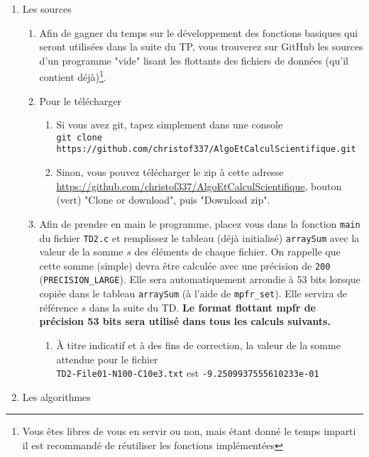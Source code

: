 \documentclass{exam}
\begin{document}
    \begin{enumerate}
        \item Les sources
        \begin{enumerate}
            \item Afin de gagner du temps sur le développement des fonctions basiques qui seront utilisées dans la suite du TP, vous trouverez sur GitHub les sources d'un programme "vide" lisant les flottants des fichiers de données (qu'il contient déjà)\footnote{Vous êtes libres de vous en servir ou non, mais étant donné le temps imparti il est recommandé de réutiliser les fonctions implémentées}.
            \item Pour le télécharger
            \begin{enumerate}
                \item Si vous avez git, tapez simplement dans une console\\\verb=git clone https://github.com/christof337/AlgoEtCalculScientifique.git=
                \item Sinon, vous pouvez télécharger le zip à cette adresse\\\url{https://github.com/christof337/AlgoEtCalculScientifique}, bouton (vert) "Clone or download", puis "Download zip".
            \end{enumerate}
            \item Afin de prendre en main le programme, placez vous dans la fonction \verb=main= du fichier \verb=TD2.c= et remplissez le tableau (déjà initialisé) \verb=arraySum= avec la valeur de la somme $s$ des éléments de chaque fichier. On rappelle que cette somme (simple) devra être calculée avec une précision de \verb=200= (\verb=PRECISION_LARGE=). Elle sera automatiquement arrondie à 53 bits lorsque copiée dans le tableau \verb=arraySum= (à l'aide de \verb=mpfr_set=). Elle servira de référence $s$ dans la suite du TD. \textbf{Le format flottant mpfr de précision 53 bits sera utilisé dans tous les calculs suivants.}
            \begin{enumerate}
                \item \footnotesize À titre indicatif et à des fins de correction, la valeur de la somme attendue pour le fichier\\\verb=TD2-File01-N100-C10e3.txt= est \verb=-9.2509937555610233e-01=
            \end{enumerate}
        \end{enumerate}
        \item Les algorithmes
        \begin{enumerate}

\end{enumerate}
\end{enumerate}
\end{document}
